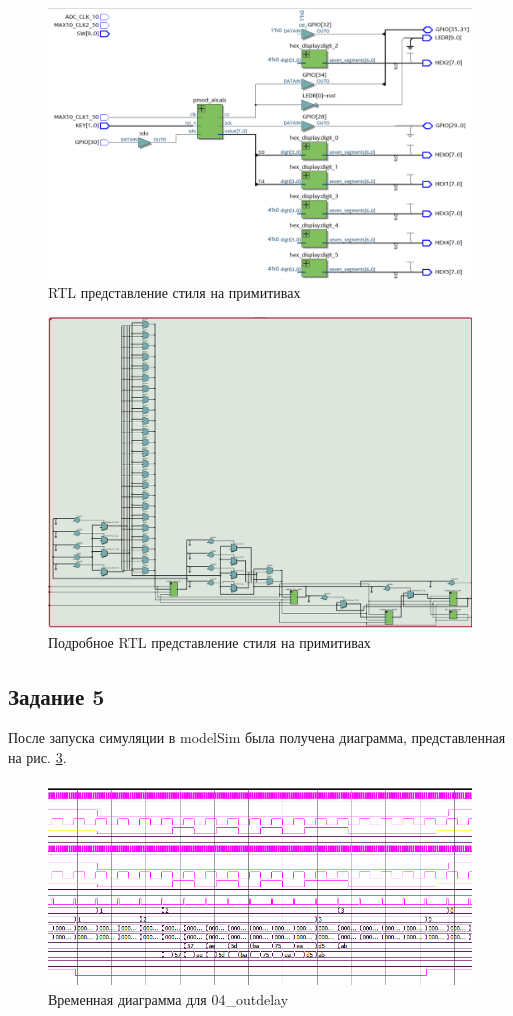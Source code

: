 \documentclass[a4paper,14pt]{article}
\begin{document}
	\begin{figure}[H]
		\centering
		\includegraphics[width=0.9\linewidth]{images/9_4_rtl}
		\caption{RTL представление стиля на примитивах}
		\label{fig:9_4_rtl}
	\end{figure}
	
	\begin{figure}[H]
		\centering
		\includegraphics[width=0.9\linewidth]{images/9_4_rtl2}
		\caption{Подробное RTL представление стиля на примитивах}
		\label{fig:9_4_rtl2}
	\end{figure}

	\subsection{Задание 5}
	
	После запуска симуляции в modelSim была получена диаграмма, представленная на рис. \ref{fig:z5msimwvf}.
	
	\begin{figure}[H]
		\centering
		\includegraphics[width=0.7\linewidth]{images/z5_msim_wvf}
		\caption{Временная диаграмма для 04\_outdelay}
		\label{fig:z5msimwvf}
	\end{figure}
	
\end{document}
